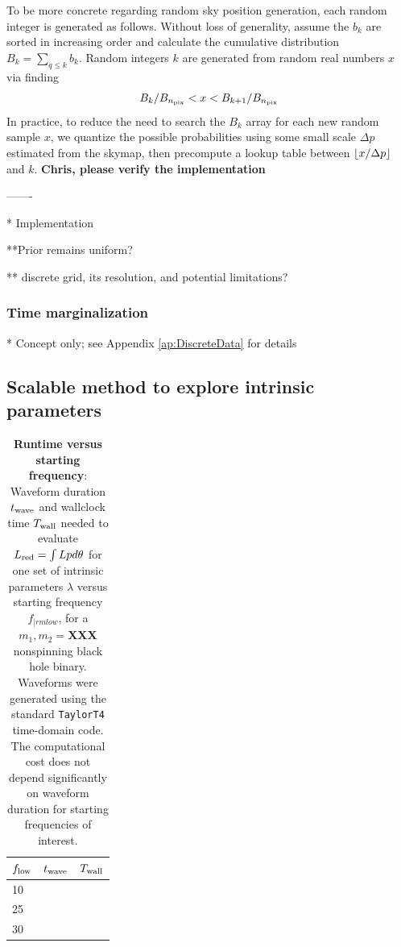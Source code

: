 \documentclass[twocolumn,prd,nofootinbib]{revtex4}
\newcommand\editremark[1]{{\color{red} #1}}
\DeclarePairedDelimiter\floor{\lfloor}{\rfloor}
\begin{document}
To be more concrete regarding random sky position generation, each random integer is generated as follows. 
%
Without loss of generality, assume the $b_k$ are sorted in increasing order and calculate the cumulative distribution $B_k
= \sum_{q\le k} b_k$.   Random integers $k$ are generated from random real numbers $x$ via finding
\begin{eqnarray}
 B_k/B_{n_{\rm pix}} < x <  B_{k+1}/B_{n_{\rm pix}}
\end{eqnarray}
In practice, to reduce the need to search the $B_k$ array for each new random sample $x$, we quantize the possible probabilities
using some small scale $\Delta p$ estimated from the skymap, then  precompute a lookup table between $\floor*{x/\Delta
  p}$ and $k$.    \textbf{Chris, please verify the implementation}




-------

*  \editremark{Implementation}

**Prior remains uniform?

**  discrete grid, its resolution, and potential limitations?

\subsubsection{Time marginalization}

* Concept only; see Appendix \ref{ap:DiscreteData} for details



\subsection{Scalable method to explore intrinsic parameters }

\begin{table}
\begin{tabular}{lll}
$f_{\rm low}$ & $t_{\rm wave}$ & $T_{\rm wall}$ \\\hline
10 & & \\
25 & & \\
30 & & \\
\end{tabular}
\caption{\textbf{Runtime versus starting frequency}: Waveform duration $t_{\rm wave}$ and wallclock time $T_{\rm wall}$  needed to evaluate $L_{\rm red}=\int L p d\theta$
  for one set of intrinsic parameters $\lambda$ versus starting frequency $f_{|rm low}$, for a $m_1,m_2=\textbf{XXX}$
  nonspinning black hole binary.  Waveforms were generated using the standard \texttt{TaylorT4} time-domain code.  The
  computational cost does not depend significantly on waveform duration for starting frequencies of interest. 
}
\end{table}
\end{document}
